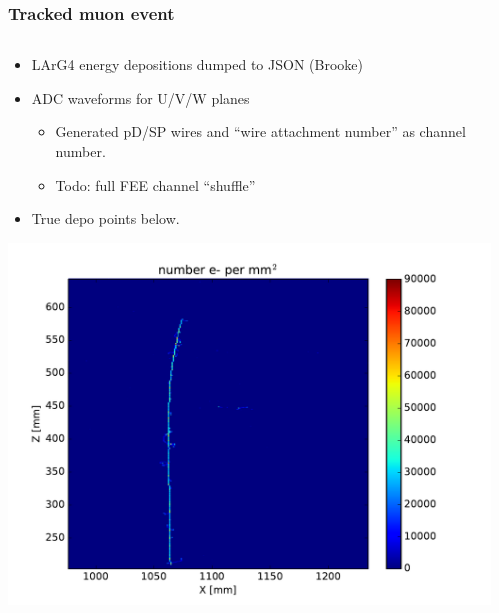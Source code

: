\documentclass[xcolor=dvipsnames]{beamer}
\begin{document}
\begin{frame}
  \frametitle{Tracked muon event}
  \begin{columns}
    \begin{column}{0.5\textwidth}
      \begin{itemize}\footnotesize
      \item LArG4 energy depositions dumped to JSON (Brooke)
      \item ADC waveforms for U/V/W planes
        \begin{itemize}\scriptsize
        \item Generated pD/SP wires and ``wire attachment number'' as channel number.
        \item Todo: full FEE channel ``shuffle''
        \end{itemize}
      \item True depo points below.
      \end{itemize}

      \includegraphics[width=\textwidth]{g4tuple-qsn-v1-fixed-nxz.pdf}
    \end{column}
    \begin{column}{0.5\textwidth}
      \vspace{-15mm}


\end{column}
\end{columns}
\end{frame}
\end{document}
